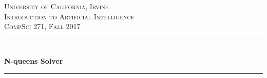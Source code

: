 \begin{titlepage}

\newcommand{\HRule}{\rule{\linewidth}{0.5mm}} %

\center %
 

\textsc{\LARGE University of California, Irvine}\\[1.5cm] %
\textsc{\Large Introduction to Artificial Intelligence}\\[0.5cm] %
\textsc{\large CompSci 271, Fall 2017}\\[0.5cm] %


\HRule \\[0.4cm]
{ \huge \bfseries N-queens Solver}\\[0.4cm] %
\HRule \\[1.5cm]
 




\end{titlepage}
